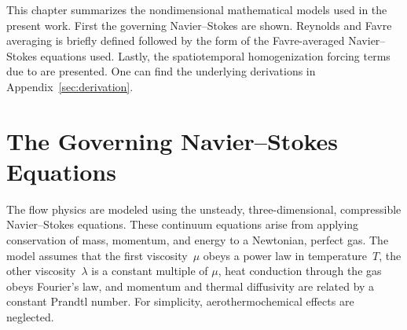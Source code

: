 \label{sec:model}
This chapter summarizes the nondimensional mathematical models used in the
present work.  First the governing Navier--Stokes are shown.  Reynolds
and Favre averaging is briefly defined followed by the form of the
Favre-averaged Navier--Stokes equations used.  Lastly, the spatiotemporal
homogenization forcing terms due to \citep{Topalian2014Spatiotemporal}
are presented.  One can find the underlying derivations in
Appendix~\ref{sec:derivation}.

\section{The Governing Navier--Stokes Equations}
\label{sec:goveqn}

The flow physics are modeled using the unsteady, three-dimensional,
compressible Navier--Stokes equations.  These continuum equations arise from
applying conservation of mass, momentum, and energy to a Newtonian, perfect
gas.  The model assumes that the first viscosity~$\mu$ obeys a power law in
temperature~$T$, the other viscosity~$\lambda$ is a constant multiple of $\mu$,
heat conduction through the gas obeys Fourier's law, and momentum and thermal
diffusivity are related by a constant Prandtl number.  For simplicity,
aerothermochemical effects are neglected.


